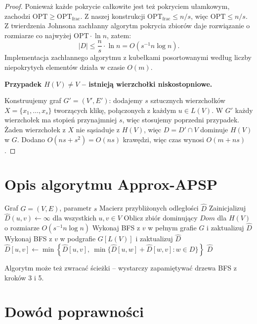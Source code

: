 \begin{proof}
Ponieważ każde pokrycie całkowite jest też pokryciem ułamkowym, zachodzi $\mathrm{OPT} \geq \mathrm{OPT_{frac}}$. Z naszej konstrukcji $\mathrm{OPT_{frac}} \leq n/s$, więc $\mathrm{OPT} \leq n/s$. Z twierdzenia Johnsona \cite{Johnson1974} zachłanny algorytm pokrycia zbiorów daje rozwiązanie o rozmiarze co najwyżej $\mathrm{OPT} \cdot \ln n$, zatem:
\[
|D| \leq \frac{n}{s} \cdot \ln n = O(s^{-1} n \log n).
\]
Implementacja zachłannego algorytmu z kubełkami posortowanymi według liczby niepokrytych elementów działa w czasie $O(m)$.

\textbf{Przypadek $H(V) \neq V$ -- istnieją wierzchołki niskostopniowe.}

Konstruujemy graf $G' = (V', E')$: dodajemy $s$ sztucznych wierzchołków $X = \{x_1, \ldots, x_s\}$ tworzących klikę, połączonych z każdym $u \in L(V)$. W $G'$ każdy wierzchołek ma stopień przynajmniej $s$, więc stosujemy poprzedni przypadek. Żaden wierzchołek z $X$ nie sąsiaduje z $H(V)$, więc $D = D' \cap V$ dominuje $H(V)$ w $G$. Dodano $O(ns + s^2) = O(ns)$ krawędzi, więc czas wynosi $O(m + ns)$.
\end{proof}

\section{Opis algorytmu Approx-APSP}

\begin{algorithm}
\caption{Approx-APSP -- aproksymacja APSP w grafie nieważonym nieskierowanym}
\begin{algorithmic}[1]
\Require Graf $G = (V, E)$, parametr $s$
\Ensure Macierz przybliżonych odległości $\hat{D}$
\State Zainicjalizuj $\hat{D}(u, v) \leftarrow \infty$ dla wszystkich $u, v \in V$
\State Oblicz zbiór dominujący $Dom$ dla $H(V)$ o rozmiarze $O(s^{-1} n \log n)$
  \State Wykonaj BFS z $v$ w pełnym grafie $G$ i zaktualizuj $\hat{D}$
\EndFor
{}
  \State Wykonaj BFS z $v$ w podgrafie $G[L(V)]$ i zaktualizuj $\hat{D}$
\EndFor
{}
  \State $\hat{D}[u, v] \leftarrow \min\!\left\{\hat{D}[u, v],\ \min\bigl\{\hat{D}[u, w] + \hat{D}[w, v] : w \in D\bigr\}\right\}$
\EndFor
\State \Return $\hat{D}$
\end{algorithmic}
\end{algorithm}

Algorytm może też zwracać ścieżki -- wystarczy zapamiętywać drzewa BFS z kroków 3 i 5.

\section{Dowód poprawności}

